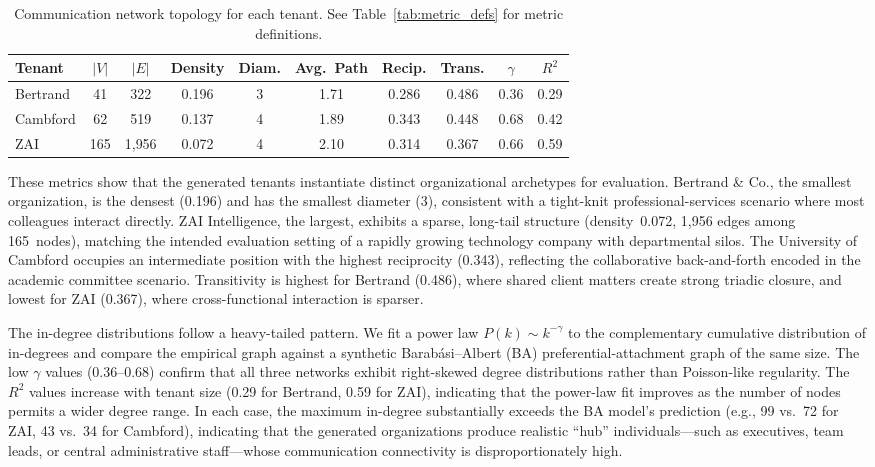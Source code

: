 \begin{table}[h]
\centering
\caption{Communication network topology for each tenant. See Table~\ref{tab:metric_defs} for metric definitions.}
\label{tab:network_metrics}
\small
\begin{tabular}{lccccccccc}
\toprule
\textbf{Tenant} & \textbf{$|V|$} & \textbf{$|E|$} & \textbf{Density} & \textbf{Diam.} & \textbf{Avg.\ Path} & \textbf{Recip.} & \textbf{Trans.} & \textbf{$\gamma$} & \textbf{$R^2$} \\
\midrule
Bertrand       & 41  & 322   & 0.196 & 3 & 1.71 & 0.286 & 0.486 & 0.36 & 0.29 \\
Cambford       & 62  & 519   & 0.137 & 4 & 1.89 & 0.343 & 0.448 & 0.68 & 0.42 \\
ZAI            & 165 & 1{,}956 & 0.072 & 4 & 2.10 & 0.314 & 0.367 & 0.66 & 0.59 \\
\bottomrule
\end{tabular}
\end{table}

\noindent These metrics show that the generated tenants instantiate distinct organizational archetypes for evaluation. Bertrand \& Co., the smallest organization, is the densest (0.196) and has the smallest diameter (3), consistent with a tight-knit professional-services scenario where most colleagues interact directly. ZAI Intelligence, the largest, exhibits a sparse, long-tail structure (density~0.072, 1{,}956 edges among 165~nodes), matching the intended evaluation setting of a rapidly growing technology company with departmental silos. The University of Cambford occupies an intermediate position with the highest reciprocity (0.343), reflecting the collaborative back-and-forth encoded in the academic committee scenario. Transitivity is highest for Bertrand (0.486), where shared client matters create strong triadic closure, and lowest for ZAI (0.367), where cross-functional interaction is sparser.

The in-degree distributions follow a heavy-tailed pattern. We fit a power law $P(k) \sim k^{-\gamma}$ to the complementary cumulative distribution of in-degrees and compare the empirical graph against a synthetic Barab\'{a}si--Albert (BA) preferential-attachment graph of the same size. The low $\gamma$ values (0.36--0.68) confirm that all three networks exhibit right-skewed degree distributions rather than Poisson-like regularity. The $R^2$ values increase with tenant size (0.29 for Bertrand, 0.59 for ZAI), indicating that the power-law fit improves as the number of nodes permits a wider degree range. In each case, the maximum in-degree substantially exceeds the BA model's prediction (e.g., 99 vs.\ 72 for ZAI, 43 vs.\ 34 for Cambford), indicating that the generated organizations produce realistic ``hub'' individuals---such as executives, team leads, or central administrative staff---whose communication connectivity is disproportionately high.

